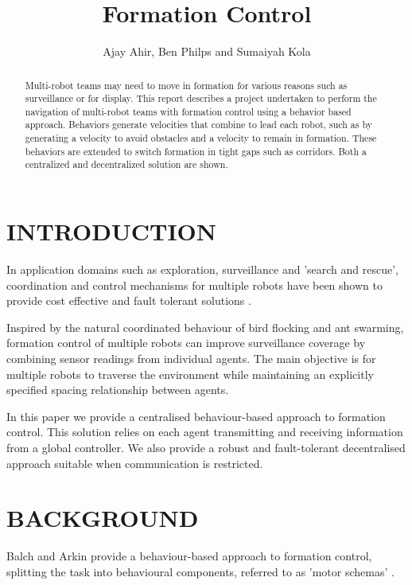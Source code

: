 \documentclass[letterpaper, 10 pt, conference]{ieeeconf}  %
\title{\LARGE \bf Formation Control}
\author{Ajay Ahir, Ben Philps and Sumaiyah Kola}
\begin{document}
\maketitle
\thispagestyle{empty}
\pagestyle{empty}

\begin{abstract}

Multi-robot teams may need to move in formation for various reasons such as surveillance or for display. This report describes a project undertaken to perform the navigation of multi-robot teams with formation control using a behavior based approach. Behaviors generate velocities that combine to lead each robot, such as by generating a velocity to avoid obstacles and a velocity to remain in formation. These behaviors are extended to switch formation in tight gaps such as corridors. Both a centralized and decentralized solution are shown.

\end{abstract}


\section{INTRODUCTION}

In application domains such as exploration, surveillance and 'search and rescue', coordination and control mechanisms for multiple robots have been shown to provide cost effective and fault tolerant solutions \cite{c1}.

Inspired by the natural coordinated behaviour of bird flocking and ant swarming, formation control of multiple robots can improve surveillance coverage by combining sensor readings from individual agents. The main objective is for multiple robots to traverse the environment while maintaining an explicitly specified spacing relationship between agents.

In this paper we provide a centralised behaviour-based approach to formation control. This solution relies on each agent transmitting and receiving information from a global controller. We also provide a robust and fault-tolerant decentralised approach suitable when communication is restricted.

\section{BACKGROUND}
Balch and Arkin provide a behaviour-based approach to formation control, splitting the task into behavioural components, referred to as 'motor schemas' \cite{c2}. 
\end{document}
